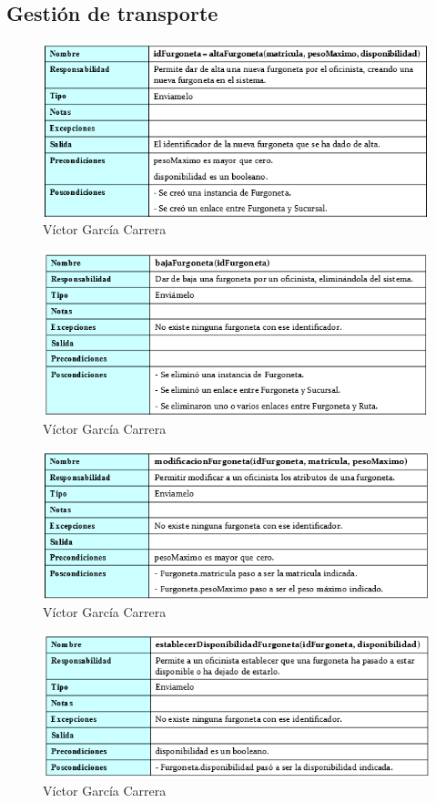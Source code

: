 \subsection{Gestión de transporte}
\begin{figure}[H]
	\centering
	\includegraphics[width=16cm]{1}
	\caption{Víctor García Carrera}
\end{figure}
\begin{figure}[H]
	\centering
	\includegraphics[width=16cm]{2}
	\caption{Víctor García Carrera}
\end{figure}
\begin{figure}[H]
	\centering
	\includegraphics[width=16cm]{3}
	\caption{Víctor García Carrera}
\end{figure}
\begin{figure}[H]
	\centering
	\includegraphics[width=16cm]{4}
	\caption{Víctor García Carrera}
\end{figure}
